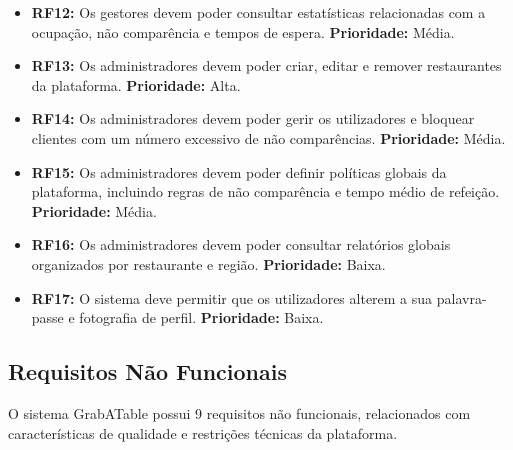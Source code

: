 \begin{itemize}
    \item \textbf{RF12:} Os gestores devem poder consultar estatísticas relacionadas com a ocupação, não comparência e tempos de espera. \textbf{Prioridade:} Média.

    \item \textbf{RF13:} Os administradores devem poder criar, editar e remover restaurantes da plataforma. \textbf{Prioridade:} Alta.

    \item \textbf{RF14:} Os administradores devem poder gerir os utilizadores e bloquear clientes com um número excessivo de não comparências. \textbf{Prioridade:} Média.

    \item \textbf{RF15:} Os administradores devem poder definir políticas globais da plataforma, incluindo regras de não comparência e tempo médio de refeição. \textbf{Prioridade:} Média.

    \item \textbf{RF16:} Os administradores devem poder consultar relatórios globais organizados por restaurante e região. \textbf{Prioridade:} Baixa.

    \item \textbf{RF17:} O sistema deve permitir que os utilizadores alterem a sua palavra-passe e fotografia de perfil. \textbf{Prioridade:} Baixa.

\end{itemize}


\subsection{Requisitos Não Funcionais}
\label{chap:rnf}

O sistema GrabATable possui 9 requisitos não funcionais, relacionados com características de qualidade e restrições técnicas da plataforma.

